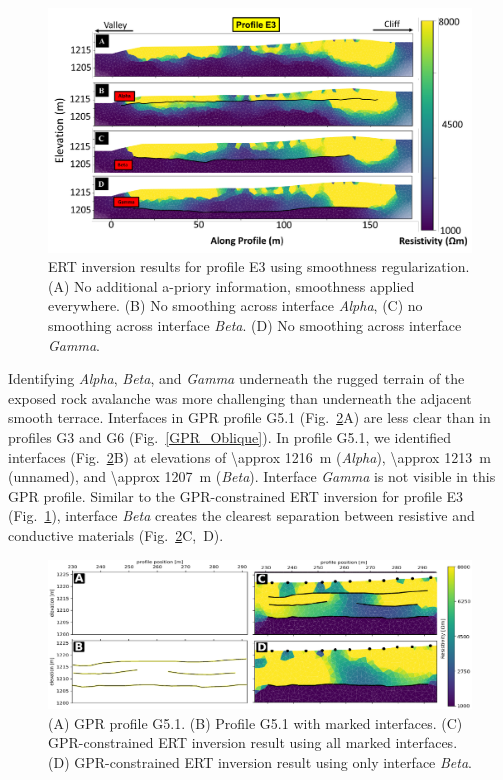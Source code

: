 \documentclass[utf8]{frontiersSCNS}
\begin{document}
							 \begin{figure}

	\includegraphics[width=\textwidth]{Figures/ERT_inversion.pdf}
		\caption{ERT inversion results for profile E3 using smoothness regularization. (A) No additional a-priory information, smoothness applied everywhere. (B) No smoothing across interface \emph{Alpha}, (C) no smoothing across interface \emph{Beta}. (D) No smoothing across interface \emph{Gamma}.\label{ERT_inversion}}

								   \end{figure}

Identifying \emph{Alpha}, \emph{Beta}, and \emph{Gamma} underneath the rugged terrain of the exposed rock avalanche was more challenging than underneath the adjacent smooth terrace. Interfaces in GPR profile G5.1 (Fig.~\ref{Combined_ABCD}A) are less clear than in profiles G3 and G6 (Fig.~\ref{GPR_Oblique}). In profile G5.1, we identified interfaces (Fig.~\ref{Combined_ABCD}B) at elevations of \SI{\approx 1216}{m} (\emph{Alpha}), \SI{\approx 1213}{m} (unnamed), and \SI{\approx 1207}{m} (\emph{Beta}). Interface \emph{Gamma} is not visible in this GPR profile. Similar to the GPR-constrained ERT inversion for profile E3 (Fig.~\ref{ERT_inversion}), interface \emph{Beta} creates the clearest separation between resistive and conductive materials (Fig.~\ref{Combined_ABCD}C,~D).  

                                \begin{figure}

	\includegraphics[width=\textwidth]{Figures/Combined_ABCD.pdf}
		\caption{(A) GPR profile G5.1. (B) Profile G5.1 with marked interfaces. (C) GPR-constrained ERT inversion result using all marked interfaces. (D) GPR-constrained ERT inversion result using only interface \emph{Beta}. \label{Combined_ABCD}}

								   \end{figure}
\end{document}
